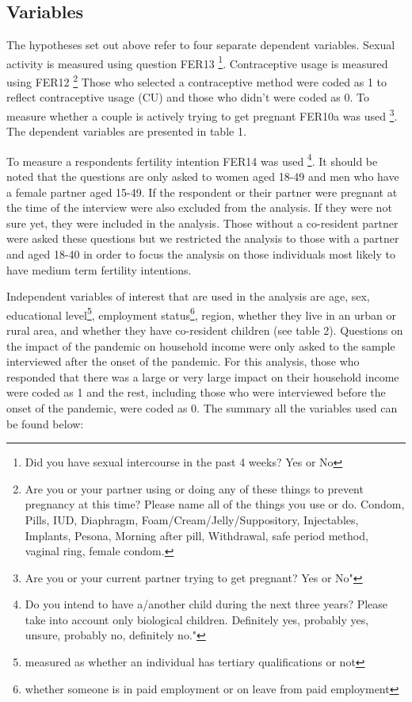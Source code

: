 \documentclass[10pt,letterpaper]{article}
\begin{document}
\subsection*{Variables}
The hypotheses set out above refer to four separate dependent variables. Sexual activity is measured using question FER13 \footnote{Did you have sexual intercourse in the past 4 weeks? Yes or No}. Contraceptive usage is measured using FER12 \footnote{Are you or your partner using or doing any of these things to prevent pregnancy at this time? Please name all of the things you use or do. Condom, Pills, IUD, Diaphragm, Foam/Cream/Jelly/Suppository, Injectables, Implants, Pesona, Morning after pill, Withdrawal, safe period method, vaginal ring, female condom.} Those who selected a contraceptive method were coded as 1 to reflect contraceptive usage (CU) and those who didn't were coded as 0. To measure whether a couple is actively trying to get pregnant FER10a was used \footnote{Are you or your current partner trying to get pregnant? Yes or No"}. The dependent variables are presented in table 1.
\begin{center}

\end{center}
To measure a respondents fertility intention FER14 was used \footnote{Do you intend to have a/another child during the next three years? Please take into account only biological children. Definitely yes, probably yes, unsure, probably no, definitely no."}. It should be noted that the questions are only asked to women aged 18-49 and men who have a female partner aged 15-49. If the respondent or their partner were pregnant at the time of the interview were also excluded from the analysis. If they were not sure yet, they were included in the analysis. Those without a co-resident partner were asked these questions but we restricted the analysis to those with a partner and aged 18-40 in order to focus the analysis on those individuals most likely to have medium term fertility intentions.
\begin{center}

\end{center}
Independent variables of interest that are used in the analysis are age, sex, educational level\footnote{measured as whether an individual has tertiary qualifications or not}, employment status\footnote{whether someone is in paid employment or on leave from paid employment}, region, whether they live in an urban or rural area, and whether they have co-resident children (see table 2). Questions on the impact of the pandemic on household income were only asked to the sample interviewed after the onset of the pandemic. For this analysis, those who responded that there was a large or very large impact on their household income were coded as 1 and the rest, including those who were interviewed before the onset of the pandemic, were coded as 0. The summary all the variables used can be found below:
\end{document}
